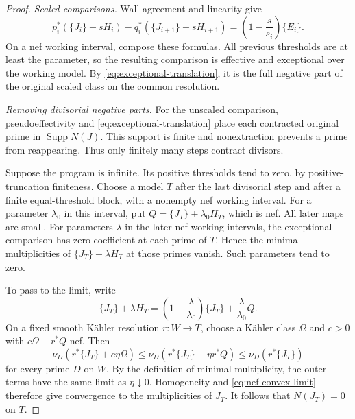 \documentclass[11pt,a4paper]{article}
\numberwithin{equation}{section}
\theoremstyle{definition}
\theoremstyle{remark}
\newcommand{\Supp}{\operatorname{Supp}}\newcommand{\Sing}{\operatorname{Sing}}
\begin{document}
\begin{proof}
\emph{Scaled comparisons.}
Wall agreement and linearity give
\begin{equation}\label{eq:scaling-comparison}
 p_i^*(\{J_i\}+sH_i)-q_i^*(\{J_{i+1}\}+sH_{i+1})
 =\left(1-\frac{s}{s_i}\right)\{E_i\}.
\end{equation}
On a nef working interval, compose these formulas. All previous
thresholds are at least the parameter, so the resulting comparison
is effective and exceptional over the working model. By
\eqref{eq:exceptional-translation}, it is the full negative part
of the original scaled class on the common resolution.

\smallskip\noindent\emph{Removing divisorial negative parts.}
For the unscaled comparison, pseudoeffectivity and
\eqref{eq:exceptional-translation} place each contracted original
prime in $\Supp N(J)$. This support is finite and
nonextraction prevents a prime from reappearing. Thus only finitely
many steps contract divisors.

Suppose the program is infinite. Its positive thresholds tend to
zero, by positive-truncation finiteness. Choose a model $T$ after
the last divisorial step and after a finite equal-threshold block,
with a nonempty nef working interval. For a parameter $\lambda_0$
in this interval, put $Q=\{J_T\}+\lambda_0H_T$, which is nef.
All later maps are small. For parameters $\lambda$ in the later nef working intervals, the
exceptional comparison has zero coefficient at each prime of $T$.
Hence the minimal multiplicities of $\{J_T\}+\lambda H_T$ at
those primes vanish. Such parameters tend to zero.

To pass to the limit, write
\begin{equation}\label{eq:nef-convex-limit}
 \{J_T\}+\lambda H_T
 =\left(1-\frac{\lambda}{\lambda_0}\right)\{J_T\}
   +\frac{\lambda}{\lambda_0}Q.
\end{equation}
On a fixed smooth Kähler resolution $r:W\to T$, choose a Kähler
class $\Omega$ and $c>0$ with $c\Omega-r^*Q$ nef. Then
\[
 \nu_D(r^*\{J_T\}+c\eta\Omega)
 \le\nu_D(r^*\{J_T\}+\eta r^*Q)
 \le\nu_D(r^*\{J_T\})
\]
for every prime $D$ on $W$. By the definition of minimal multiplicity, the outer terms have
the same limit as $\eta\downarrow0$. Homogeneity and
\eqref{eq:nef-convex-limit} therefore give convergence to the
multiplicities of $J_T$. It follows that $N(J_T)=0$ on $T$.


\end{proof}
\end{document}
